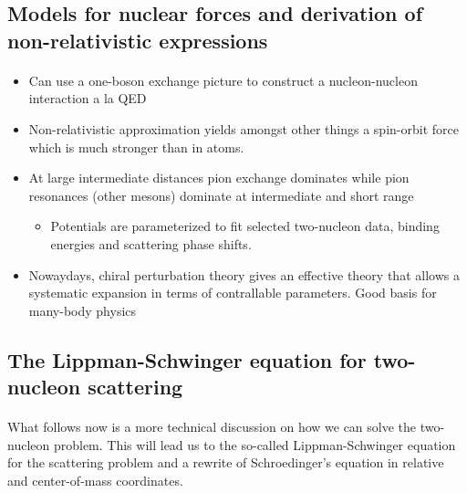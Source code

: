 \documentclass[%
twoside,                 %
final,                   %
10pt]{article}
\begin{document}
\subsection*{Models for nuclear forces and derivation of non-relativistic expressions}

\paragraph{}

\begin{itemize}
\item Can use a one-boson exchange picture to construct a nucleon-nucleon interaction a la QED

\item Non-relativistic approximation yields amongst other things a spin-orbit force which is much stronger than in atoms.

\item At large intermediate distances pion exchange dominates while  pion resonances (other mesons) dominate at intermediate and short range 
\begin{itemize}

 \item Potentials are parameterized to fit selected two-nucleon data, binding energies and scattering phase shifts.

\end{itemize}

\noindent
\item Nowaydays, chiral perturbation theory gives an effective theory that allows a systematic expansion in terms of contrallable parameters. Good basis for many-body physics
\end{itemize}

\noindent





\subsection*{The Lippman-Schwinger equation for two-nucleon scattering}

\paragraph{}
What follows now is a more technical discussion on how we can solve the two-nucleon problem.
This will lead us to the so-called Lippman-Schwinger equation for the scattering problem and a rewrite of Schroedinger's equation in relative and center-of-mass coordinates. 
\end{document}

